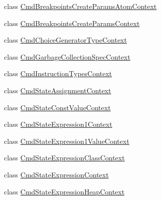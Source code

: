 \begin{DoxyCompactItemize}
class \hyperlink{classgov_1_1nasa_1_1jpf_1_1inspector_1_1server_1_1expression_1_1parser_1_1_expression_grammar_paa3acc222754f42ff002c5d98d8d38136}{Cmd\+Breakpoints\+Create\+Params\+Atom\+Context}
\item 
class \hyperlink{classgov_1_1nasa_1_1jpf_1_1inspector_1_1server_1_1expression_1_1parser_1_1_expression_grammar_pa40092569cc5b197b7a5caae27da04e05}{Cmd\+Breakpoints\+Create\+Params\+Context}
\item 
class \hyperlink{classgov_1_1nasa_1_1jpf_1_1inspector_1_1server_1_1expression_1_1parser_1_1_expression_grammar_pa25195f4046c6a14884faf2c870f5b76d}{Cmd\+Choice\+Generator\+Type\+Context}
\item 
class \hyperlink{classgov_1_1nasa_1_1jpf_1_1inspector_1_1server_1_1expression_1_1parser_1_1_expression_grammar_pa9b16c5c3aaa9986dba28b01bf7446bf9}{Cmd\+Garbage\+Collection\+Spec\+Context}
\item 
class \hyperlink{classgov_1_1nasa_1_1jpf_1_1inspector_1_1server_1_1expression_1_1parser_1_1_expression_grammar_pab3186941420d0c466c6d856eeff6b665}{Cmd\+Instruction\+Types\+Context}
\item 
class \hyperlink{classgov_1_1nasa_1_1jpf_1_1inspector_1_1server_1_1expression_1_1parser_1_1_expression_grammar_padaf6f2235297f2d833b81c76746458f3}{Cmd\+State\+Assignment\+Context}
\item 
class \hyperlink{classgov_1_1nasa_1_1jpf_1_1inspector_1_1server_1_1expression_1_1parser_1_1_expression_grammar_pa618023edddc6cf63ca4452111d0560c6}{Cmd\+State\+Const\+Value\+Context}
\item 
class \hyperlink{classgov_1_1nasa_1_1jpf_1_1inspector_1_1server_1_1expression_1_1parser_1_1_expression_grammar_pa1eb341e049a8047f26aa8b84266a8b94}{Cmd\+State\+Expression1\+Context}
\item 
class \hyperlink{classgov_1_1nasa_1_1jpf_1_1inspector_1_1server_1_1expression_1_1parser_1_1_expression_grammar_paacaa2424bb30d5b61478a2ac87dd697e}{Cmd\+State\+Expression1\+Value\+Context}
\item 
class \hyperlink{classgov_1_1nasa_1_1jpf_1_1inspector_1_1server_1_1expression_1_1parser_1_1_expression_grammar_pa672388ef0800b4a3d173ab7548f6b406}{Cmd\+State\+Expression\+Class\+Context}
\item 
class \hyperlink{classgov_1_1nasa_1_1jpf_1_1inspector_1_1server_1_1expression_1_1parser_1_1_expression_grammar_pa37db371aaa956234112b7f14e4ab3f14}{Cmd\+State\+Expression\+Context}
\item 
class \hyperlink{classgov_1_1nasa_1_1jpf_1_1inspector_1_1server_1_1expression_1_1parser_1_1_expression_grammar_pa4cb3092c60a124c5db4482cce4b4fe10}{Cmd\+State\+Expression\+Heap\+Context}

\end{DoxyCompactItemize}
